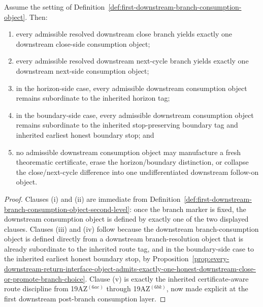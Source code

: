 \begin{proposition}
\label{prop:every-resolved-downstream-branch-yields-exactly-one-route-faithful-downstream-consumption-object}
Assume the setting of Definition~\ref{def:first-downstream-branch-consumption-object}. Then:
\begin{enumerate}[label=(\roman*)]
 \item every admissible resolved downstream close branch yields exactly one downstream close-side consumption object;
 \item every admissible resolved downstream next-cycle branch yields exactly one downstream next-side consumption object;
 \item in the horizon-side case, every admissible downstream consumption object remains subordinate to the inherited horizon tag;
 \item in the boundary-side case, every admissible downstream consumption object remains subordinate to the inherited stop-preserving boundary tag and inherited earliest honest boundary stop; and
 \item no admissible downstream consumption object may manufacture a fresh theorematic certificate, erase the horizon/boundary distinction, or collapse the close/next-cycle difference into one undifferentiated downstream follow-on object.
\end{enumerate}
\end{proposition}

\begin{proof}
Clauses (i) and (ii) are immediate from Definition~\ref{def:first-downstream-branch-consumption-object-second-level}: once the branch marker is fixed, the downstream consumption object is defined by exactly one of the two displayed clauses. Clauses (iii) and (iv) follow because the downstream branch-consumption object is defined directly from a downstream branch-resolution object that is already subordinate to the inherited route tag, and in the boundary-side case to the inherited earliest honest boundary stop, by Proposition~\ref{prop:every-downstream-return-interface-object-admits-exactly-one-honest-downstream-close-or-promote-branch-choice}. Clause (v) is exactly the inherited certificate-aware route discipline from 19AZ$^{(6ae)}$ through 19AZ$^{(6bk)}$, now made explicit at the first downstream post-branch consumption layer.
\end{proof}

